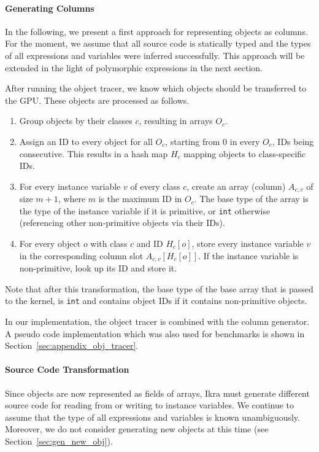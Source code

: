 \documentclass[preprint]{sigplanconf}
\begin{document}
\paragraph{Generating Columns}
In the following, we present a first approach for representing objects as columns. For the moment, we assume that all source code is statically typed and the types of all expressions and variables were inferred successfully. This approach will be extended in the light of polymorphic expressions in the next section.

After running the object tracer, we know which objects should be transferred to the GPU. These objects are processed as follows.
\begin{enumerate}
    \item Group objects by their classes $c$, resulting in arrays $O_c$.
    \item Assign an ID to every object for all $O_c$, starting from $0$ in every $O_c$, IDs being consecutive. This results in a hash map $H_c$ mapping objects to class-specific IDs.
    \item For every instance variable $v$ of every class $c$, create an array (column) $A_{c,v}$ of size $m + 1$, where $m$ is the maximum ID in $O_c$. The base type of the array is the type of the instance variable if it is primitive, or \texttt{int} otherwise (referencing other non-primitive objects via their IDs).
    \item For every object $o$ with class $c$ and ID $H_c[o]$, store every instance variable $v$ in the corresponding column slot $A_{c, v}[H_c[o]]$. If the instance variable is non-primitive, look up its ID and store it.
\end{enumerate}

Note that after this transformation, the base type of the base array that is passed to the kernel, is \texttt{int} and contains object IDs if it contains non-primitive objects.

In our implementation, the object tracer is combined with the column generator. A pseudo code implementation which was also used for benchmarks is shown in Section~\ref{sec:appendix_obj_tracer}.

\paragraph{Source Code Transformation}
Since objects are now represented as fields of arrays, Ikra must generate different source code for reading from or writing to instance variables. We continue to assume that the type of all expressions and variables is known unambiguously. Moreover, we do not consider generating new objects at this time (see Section~\ref{sec:gen_new_obj}).
\end{document}
